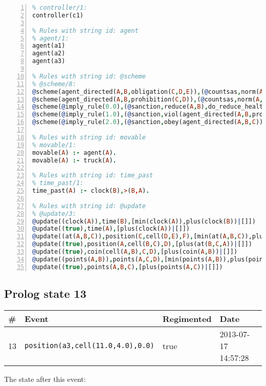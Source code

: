 \documentclass[11pt]{article}\usepackage[utf8]{inputenc}\usepackage{geometry}
\begin{document}
\begin{lstlisting}[language=Prolog, numbers=left]
% Rules with string id: controller
% controller/1:
controller(c1)

% Rules with string id: agent
% agent/1:
agent(a1)
agent(a2)
agent(a3)

% Rules with string id: @scheme
% @scheme/8:
@scheme(agent_directed(A,B,obligation(C,D,E)),(@countsas,norm(A,B,F,obligation(C,D,E)),F),false,(listTrue(C)),(time_past(D)),false,[plus(viol(agent_directed(A,B,obligation(C,D,E))))|[]],[plus(obey(agent_directed(A,B,obligation(C,D,E))))|[]])
@scheme(agent_directed(A,B,prohibition(C,D)),(@countsas,norm(A,B,E,prohibition(C,D)),E),(listTrue(C)),false,(false),false,[plus(viol(agent_directed(A,B,prohibition(C,D))))|[]],[plus(obey(agent_directed(A,B,prohibition(C,D))))|[]])
@scheme(@imply_rule(0.0),(@sanction,reduce(A,B),do_reduce_health(A,B),notifyAgent(A,changed(status))),true,false,false,false,[min(reduce(A,B))|[]],[])
@scheme(@imply_rule(1.0),(@sanction,viol(agent_directed(A,B,prohibition(C,D))),do_sanction(D)),true,false,false,false,[min(viol(agent_directed(A,B,prohibition(C,D))))|[]],[])
@scheme(@imply_rule(2.0),(@sanction,obey(agent_directed(A,B,C))),true,false,false,false,[min(obey(agent_directed(A,B,C)))|[]],[])

% Rules with string id: movable
% movable/1:
movable(A) :- agent(A).
movable(A) :- truck(A).

% Rules with string id: time_past
% time_past/1:
time_past(A) :- clock(B),>(B,A).

% Rules with string id: @update
% @update/3:
@update((clock(A)),time(B),[min(clock(A)),plus(clock(B))|[]])
@update((true),time(A),[plus(clock(A))|[]])
@update((at(A,B,C)),position(C,cell(D,E),F),[min(at(A,B,C)),plus(at(D,E,C))|[]])
@update((true),position(A,cell(B,C),D),[plus(at(B,C,A))|[]])
@update((true),coin(cell(A,B),C,D),[plus(coin(A,B))|[]])
@update((points(A,B)),points(A,C,D),[min(points(A,B)),plus(points(A,D))|[]])
@update((true),points(A,B,C),[plus(points(A,C))|[]])

\end{lstlisting}
\clearpage 
\subsection{Prolog state 13}
\begin{table}[ht]
\centering 
\begin{tabular}{l l l l} 
\textbf{\#} & \textbf{Event} & \textbf{Regimented} & \textbf{Date} \\ [0.5ex] 
\hline
13&\texttt{position(a3,cell(11.0,4.0),0.0)}&true&2013-07-17 14:57:28\\ [1ex] \hline\end{tabular}
\end{table}
The state after this event:
\end{document}
